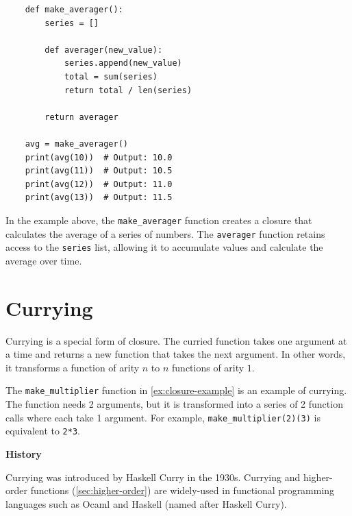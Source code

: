 \documentclass[oneside,11pt,dvipsnames]{book}
\newenvironment{historybox}[1][]{
  \small
  \begin{myhistorybox}
    {\small \textbf{#1}}
  }{
  \end{myhistorybox}
}
\newcommand{\code}[1]{\texttt{#1}}
\begin{document}
\begin{lstlisting}
    def make_averager():
        series = []

        def averager(new_value):
            series.append(new_value)
            total = sum(series)
            return total / len(series)

        return averager

    avg = make_averager()
    print(avg(10))  # Output: 10.0
    print(avg(11))  # Output: 10.5
    print(avg(12))  # Output: 11.0
    print(avg(13))  # Output: 11.5
\end{lstlisting}

In the example above, the \code{make\_averager} function creates a closure that calculates the average of a series of numbers. The \code{averager} function retains access to the \code{series} list, allowing it to accumulate values and calculate the average over time.









\section{Currying}\label{sec:curry}

Currying is a special form of closure. The curried function takes one argument at a time and returns a new function that takes the next argument. In other words, it transforms a function of arity $n$ to $n$ functions of arity $1$.

The \code{make\_multiplier} function in \autoref{ex:closure-example} is an example of currying. The function needs 2 arguments, but it is transformed into a series of 2 function calls where each take 1 argument. For example, \code{make\_multiplier(2)(3)} is equivalent to \code{2*3}.


\begin{historybox}[History] 
    Currying was introduced by Haskell Curry in the 1930s. Currying and higher-order functions (\autoref{sec:higher-order}) are widely-used in functional programming languages such as Ocaml and Haskell (named after Haskell Curry).
\end{historybox}
\end{document}
